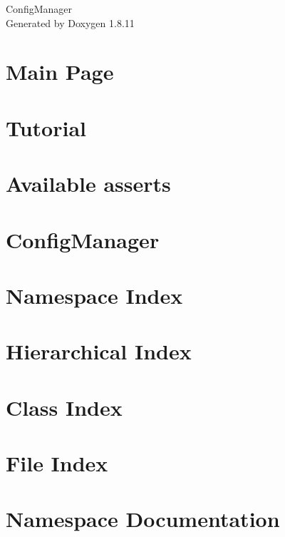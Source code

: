 \documentclass[twoside]{book}
\newcommand{\+}{\discretionary{\mbox{\scriptsize$\hookleftarrow$}}{}{}}
\newcommand{\clearemptydoublepage}{%
  \newpage{\pagestyle{empty}\cleardoublepage}%
}
\begin{document}
\hypersetup{pageanchor=false,
             bookmarksnumbered=true,
             pdfencoding=unicode
            }
\begin{titlepage}
\vspace*{7cm}
\begin{center}%
{\Large Config\+Manager }\\
\vspace*{1cm}
{\large Generated by Doxygen 1.8.11}\\
\end{center}
\end{titlepage}
\clearemptydoublepage
\tableofcontents
\clearemptydoublepage
{}
\hypersetup{pageanchor=true}

\chapter{Main Page}
\label{index}\hypertarget{index}{}
\chapter{Tutorial}
\label{tutorial}
\hypertarget{tutorial}{}

\chapter{Available asserts}
\label{asserts}
\hypertarget{asserts}{}

\chapter{Config\+Manager}
\label{md_README}
\hypertarget{md_README}{}

\chapter{Namespace Index}

\chapter{Hierarchical Index}

\chapter{Class Index}

\chapter{File Index}

\chapter{Namespace Documentation}

\end{document}
